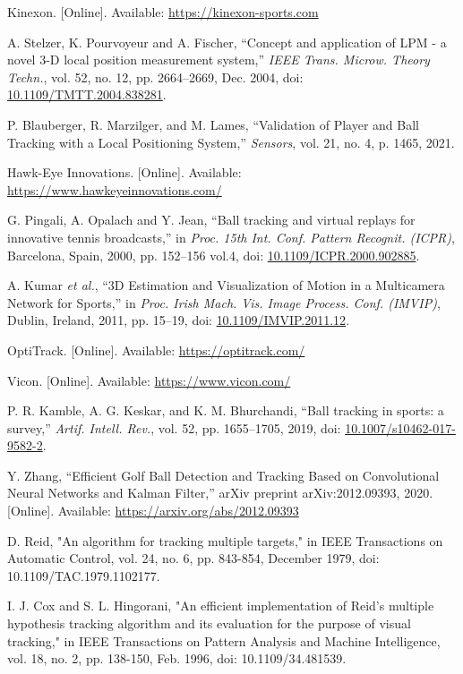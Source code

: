\documentclass[conference]{IEEEtran}
\begin{document}
\begin{thebibliography}{99}

 Kinexon. [Online]. Available: \url{https://kinexon-sports.com}

 A. Stelzer, K. Pourvoyeur and A. Fischer, ``Concept and application of LPM - a novel 3-D local position measurement system,'' \textit{IEEE Trans. Microw. Theory Techn.}, vol. 52, no. 12, pp. 2664--2669, Dec. 2004, doi: \url{10.1109/TMTT.2004.838281}.

 P. Blauberger, R. Marzilger, and M. Lames, ``Validation of Player and Ball Tracking with a Local Positioning System,'' \textit{Sensors}, vol. 21, no. 4, p. 1465, 2021.

 Hawk-Eye Innovations. [Online]. Available: \url{https://www.hawkeyeinnovations.com/}

 G. Pingali, A. Opalach and Y. Jean, ``Ball tracking and virtual replays for innovative tennis broadcasts,'' in \textit{Proc. 15th Int. Conf. Pattern Recognit. (ICPR)}, Barcelona, Spain, 2000, pp. 152--156 vol.4, doi: \url{10.1109/ICPR.2000.902885}.

 A. Kumar \textit{et al.}, ``3D Estimation and Visualization of Motion in a Multicamera Network for Sports,'' in \textit{Proc. Irish Mach. Vis. Image Process. Conf. (IMVIP)}, Dublin, Ireland, 2011, pp. 15--19, doi: \url{10.1109/IMVIP.2011.12}.

 OptiTrack. [Online]. Available: \url{https://optitrack.com/}

 Vicon. [Online]. Available: \url{https://www.vicon.com/}

 P. R. Kamble, A. G. Keskar, and K. M. Bhurchandi, ``Ball tracking in sports: a survey,'' \textit{Artif. Intell. Rev.}, vol. 52, pp. 1655--1705, 2019, doi: \url{10.1007/s10462-017-9582-2}.

 Y. Zhang, ``Efficient Golf Ball Detection and Tracking Based on Convolutional Neural Networks and Kalman Filter,'' arXiv preprint arXiv:2012.09393, 2020. [Online]. Available: \url{https://arxiv.org/abs/2012.09393}

 D. Reid, "An algorithm for tracking multiple targets," in IEEE Transactions on Automatic Control, vol. 24, no. 6, pp. 843-854, December 1979, doi: 10.1109/TAC.1979.1102177.

 I. J. Cox and S. L. Hingorani, "An efficient implementation of Reid's multiple hypothesis tracking algorithm and its evaluation for the purpose of visual tracking," in IEEE Transactions on Pattern Analysis and Machine Intelligence, vol. 18, no. 2, pp. 138-150, Feb. 1996, doi: 10.1109/34.481539.


\end{thebibliography}
\end{document}
